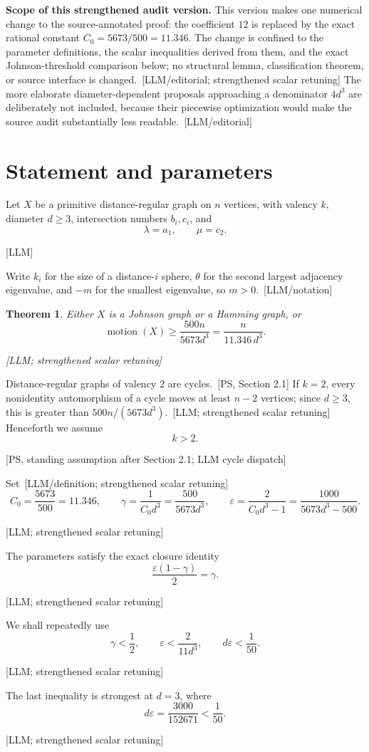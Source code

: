 \documentclass[10pt]{amsart}
\newtheorem{theorem}{Theorem}[section]
\theoremstyle{remark}
\DeclareMathOperator{\motion}{motion}
\newcommand{\eps}{\varepsilon}
\newcommand{\prov}[1]{\unskip\, {\normalfont\scriptsize\color{provgray}\textsf{[#1]}}}
\newcommand{\eqprov}[1]{%
  \par\nobreak\vspace{-0.68\baselineskip}%
  \noindent\hfill{\normalfont\scriptsize\color{provgray}\textsf{[#1]}}%
  \par\vspace{0.20\baselineskip}%
}
\begin{document}
\medskip
\noindent\textbf{Scope of this strengthened audit version.}
This version makes one numerical change to the source-annotated proof: the coefficient $12$ is replaced by the exact rational constant $C_0=5673/500=11.346$. The change is confined to the parameter definitions, the scalar inequalities derived from them, and the exact Johnson-threshold comparison below; no structural lemma, classification theorem, or source interface is changed.\prov{LLM/editorial; strengthened scalar retuning} The more elaborate diameter-dependent proposals approaching a denominator $4d^3$ are deliberately not included, because their piecewise optimization would make the source audit substantially less readable.\prov{LLM/editorial}

\section{Statement and parameters}
Let $X$ be a primitive distance-regular graph on $n$ vertices, with valency $k$, diameter $d\ge 3$, intersection numbers $b_i,c_i$, and
\[
\lambda=a_1,\qquad \mu=c_2.
\]
\eqprov{LLM}
Write $k_i$ for the size of a distance-$i$ sphere, $\theta$ for the second largest adjacency eigenvalue, and $-m$ for the smallest eigenvalue, so $m>0$.\prov{LLM/notation}

\begin{theorem}\label{thm:main}
Either $X$ is a Johnson graph or a Hamming graph, or
\begin{equation}
\motion(X)\ge \frac{500n}{5673d^3}=\frac{n}{11.346\,d^3}.
\end{equation}
\eqprov{LLM; strengthened scalar retuning}
\end{theorem}

Distance-regular graphs of valency $2$ are cycles.\prov{PS, Section 2.1} If $k=2$, every nonidentity automorphism of a cycle moves at least $n-2$ vertices; since $d\ge3$, this is greater than $500n/(5673d^3)$.\prov{LLM; strengthened scalar retuning} Henceforth we assume
\[
k>2.
\]
\eqprov{PS, standing assumption after Section 2.1; LLM cycle dispatch}

Set\prov{LLM/definition; strengthened scalar retuning}
\begin{equation}
C_0=\frac{5673}{500}=11.346,
\qquad
\gamma=\frac{1}{C_0d^3}=\frac{500}{5673d^3},
\qquad
\eps=\frac{2}{C_0d^3-1}=\frac{1000}{5673d^3-500}.
\end{equation}
\eqprov{LLM; strengthened scalar retuning}
The parameters satisfy the exact closure identity
\begin{equation}
\frac{\eps(1-\gamma)}{2}=\gamma.
\end{equation}
\eqprov{LLM; strengthened scalar retuning}
We shall repeatedly use
\begin{equation}
\gamma<\frac12,\qquad \eps<\frac{2}{11d^3},\qquad d\eps<\frac1{50}.
\end{equation}
\eqprov{LLM; strengthened scalar retuning}
The last inequality is strongest at $d=3$, where
\[
d\eps=\frac{3000}{152671}<\frac1{50}.
\]
\eqprov{LLM; strengthened scalar retuning}
\end{document}
